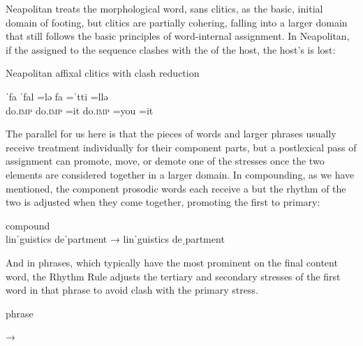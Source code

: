 \documentclass[output=paper,
modfonts
]{LSP/langsci}
\begin{document}
\noindent Neapolitan  treats the morphological word, sans clitics, as the basic, initial domain of footing, but clitics are partially cohering, falling into a larger domain that still follows the basic principles of word-internal  assignment. In Neapolitan, if the  assigned to the  sequence clashes with the  of the host, the host's  is lost:

\begin{exe}
\ex \label{ex:kaisse:9}  Neapolitan  \citep{peperkamp1997} affixal clitics with clash reduction

\gll ˈfa {\quad\quad} ˈfal \squish=lə {\quad\quad} fa \squish=ˈtti  \squish=llə\\
	do.\textsc{imp} {} do.\textsc{imp} \squish=it {} do.\textsc{imp} \squish=you \squish=it\\
\z

\noindent The parallel for us here is that the pieces of  words and larger phrases usually receive  treatment individually for their component parts, but a postlexical pass of  assignment can promote, move, or demote one of the stresses once the two elements are considered together in a larger domain. In  compounding, as we have mentioned, the component prosodic words each receive a  but the rhythm of the two is adjusted when they come together, promoting the first  to primary:

\ea \label{ex:kaisse:10}  compound \\
linˈguistics deˈpartment  → linˈguistics deˌpartment
\z 

\noindent And in  phrases, which typically have the most prominent  on the final content word, the Rhythm Rule \citep{hayes1984k} adjusts the tertiary and secondary stresses of the first word in that phrase to avoid  clash with the primary stress.

\noindent\begin{minipage}{.99\linewidth}
\ea \label{ex:kaisse:11}  phrase\\
→
\z
\end{minipage}


\end{exe}
\end{document}
